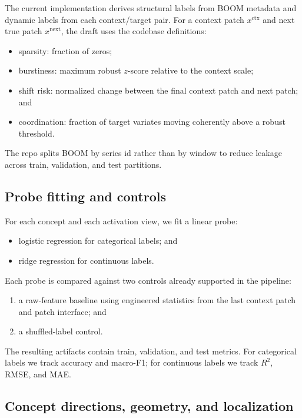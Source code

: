 \documentclass{article}
\newcommand{\boom}{\textsc{BOOM}}
\begin{document}
The current implementation derives structural labels from \boom{} metadata and dynamic labels from each context/target pair. For a context patch $x^{\text{ctx}}$ and next true patch $x^{\text{next}}$, the draft uses the codebase definitions:
\begin{itemize}[leftmargin=18pt]
\item sparsity: fraction of zeros;
\item burstiness: maximum robust $z$-score relative to the context scale;
\item shift risk: normalized change between the final context patch and next patch; and
\item coordination: fraction of target variates moving coherently above a robust threshold.
\end{itemize}

The repo splits \boom{} by series id rather than by window to reduce leakage across train, validation, and test partitions.

\subsection{Probe fitting and controls}

For each concept and each activation view, we fit a linear probe:
\begin{itemize}[leftmargin=18pt]
\item logistic regression for categorical labels; and
\item ridge regression for continuous labels.
\end{itemize}

Each probe is compared against two controls already supported in the pipeline:
\begin{enumerate}[leftmargin=18pt]
\item a raw-feature baseline using engineered statistics from the last context patch and patch interface; and
\item a shuffled-label control.
\end{enumerate}

The resulting artifacts contain train, validation, and test metrics. For categorical labels we track accuracy and macro-F1; for continuous labels we track $R^2$, RMSE, and MAE.

\subsection{Concept directions, geometry, and localization}
\end{document}
